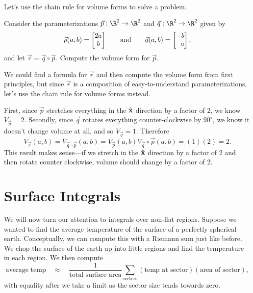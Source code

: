 %
%
Let's use the chain rule for volume forms to solve a problem.
\begin{example}
	Consider the parameterizations $\vec p:\R^2\to\R^2$ and $\vec q:\R^2\to\R^2$ given
	by
	\[
		\vec p(a,b) = \matc{2 a\\b}\qquad\text{and}\qquad \vec q(a,b) =\mat{-b\\a},
	\]
	and let $\vec r=\vec q\circ \vec p$. Compute the volume form for $\vec p$.

	We could find a formula for $\vec r$ and then compute the volume form from first
	principles, but since $\vec r$ is a composition of easy-to-understand parameterizations,
	let's use the chain rule for volume forms instead.

	First, since $\vec p$ stretches everything in the ${\hat {\mathbf x}}$ direction
	by a factor of $2$, we know $V_{\vec p}=2$.  Secondly, since $\vec q$
	rotates everything counter-clockwise by $90^\circ$, we know it doesn't
	change volume at all, and so $V_{\vec q}=1$.  Therefore
	\[
		V_{\vec r}(a,b)=V_{\vec q\circ \vec p}(a,b) = V_{\vec p}(a,b)V_{\vec q}\circ \vec p(a,b) = (1)(2) = 2.
	\]
	This result makes sense---if we stretch in the ${\hat {\mathbf x}}$ direction by a factor of $2$ and then
	rotate counter clockwise, volume should change by a factor of $2$.
\end{example}

\begin{exercises}
\end{exercises}

\section{Surface Integrals}
We will now turn our attention to integrals over non-flat regions.  Suppose
we wanted to find the average temperature of the surface of a perfectly
spherical earth.  Conceptually, we can compute this with a Riemann sum
just like before.  We chop the surface of the earth up into little regions
and find the temperature in each region.  We then compute
\[
	\text{average temp}\quad\approx\quad\frac{1}{\text{total surface area}} \sum_{\text{sectors}}
	(\text{temp at sector})(\text{area of sector}),
\]
with equality after we take a limit as the sector size tends towards zero.  

